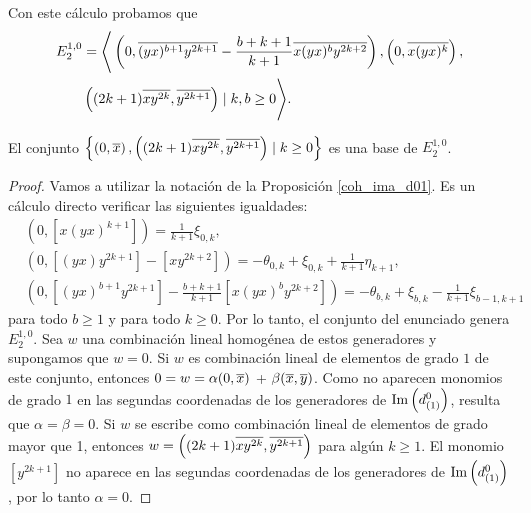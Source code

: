 \documentclass[fleqn,../tesis.tex]{subfiles}
\begin{document}
Con este cálculo probamos que
\begin{align*}
     E^{1,0}_{2} &= \Bigg\langle \left(0, \overline{(yx)^{b + 1}y^{2k + 1}} - \frac{b + k + 1}{k + 1}\overline{x(yx)^{b}y^{2k + 2}}\right),
         \left(0, \overline{x(yx)^{k}}\right),\\
      &\left((2k + 1)\overline{xy^{2k}}, \overline{y^{2k + 1}}\right) \mid k, b \geq 0\Bigg\rangle.
\end{align*}
\begin{prop}
    El conjunto $\left\lbrace\left(0, \overline{x}\right), \left((2k + 1)\overline{xy^{2k}}, \overline{y^{2k + 1}}\right) \mid k\geq 0 \right\rbrace$
    es una base de $E^{1, 0}_2$.
\end{prop}
\begin{proof}
Vamos a utilizar la notación de la Proposición \ref{coh_ima_d01}. Es un cálculo directo verificar las siguientes igualdades:
\begin{align*}
    &\left(0, \left[x(yx)^{k + 1}\right]\right) = \frac{1}{k + 1}\xi_{0, k},\\
    &\left(0, \left[(yx)y^{2k + 1}\right] - \left[xy^{2k + 2}\right]\right) =
    		-\theta_{0, k} + \xi_{0, k} + \frac{1}{k + 1}\eta_{k + 1},\\
    &\left(0, \left[(yx)^{b + 1}y^{2k + 1}\right] - \frac{b +k + 1}{k + 1}\left[x(yx)^{b}y^{2k + 2}\right]\right)
        = -\theta_{b, k} + \xi_{b, k} -\frac{1}{k + 1}\xi_{b - 1, k + 1}
\end{align*}
para todo $b \geq 1$ y para todo $k \geq 0$. Por lo tanto, el conjunto del enunciado genera $E^{1, 0}_2$. Sea $w$
una combinación lineal homogénea de estos generadores y supongamos que $w = 0$. Si $w$ es combinación lineal de elementos de 
grado $1$ de este conjunto, entonces
$0 = w = \alpha (0, \overline{x})$ + $\beta(\overline{x}, \overline{y})$. Como no aparecen monomios de grado $1$ en las segundas coordenadas
de los generadores de $\operatorname{Im}\left(d^{0}_{(1)}\right)$, resulta que $\alpha = \beta = 0$. Si $w$ se escribe como
combinación lineal de elementos de grado mayor que 1, entonces $w = \left((2k + 1)\overline{xy^{2k}}, \overline{y^{2k + 1}}\right)$ para algún $k \geq 1$. El monomio
$\left[y^{2k + 1}\right]$ no aparece en las segundas coordenadas de los generadores de $\operatorname{Im}\left(d^{0}_{(1)}\right)$, por lo tanto
$\alpha = 0$.
\end{proof}
\end{document}
